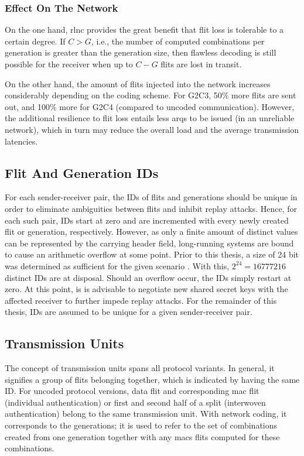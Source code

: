 \subsubsection{Effect On The Network}
On the one hand, \gls{rlnc} provides the great benefit that flit loss is tolerable to a certain degree. If $C > G$, i.e., the number of computed
combinations per generation is greater than the generation size, then flawless decoding is still possible for the receiver when up to $C - G$ flits
are lost in transit.

On the other hand, the amount of flits injected into the network increases considerably depending on the coding scheme. For G2C3, 50\% more flits are
sent out, and 100\% more for G2C4 (compared to uncoded communication). However, the additional resilience to flit loss entails less \glspl{arq} to be
issued (in an unreliable network), which in turn may reduce the overall load and the average transmission latencies.

\subsection{Flit And Generation IDs}\label{subsec:fidsandgids}
For each sender-receiver pair, the IDs of flits and generations should be unique in order to eliminate ambiguities between flits and inhibit replay
attacks. Hence, for each such pair, IDs start at zero and are incremented with every newly created flit or generation, respectively. However, as only a finite amount of
distinct values can be represented by the carrying header field, long-running systems are bound to cause an arithmetic overflow at some point. Prior
to this thesis, a size of 24 bit was determined as sufficient for the given scenario \cite[5]{franz18authdraft}. With this, $2^{24} = \num{16777216}$
distinct IDs are at disposal. Should an overflow occur, the IDs simply restart at zero. At this point, is is advisable to negotiate new shared
secret keys with the affected receiver to further impede replay attacks. For the remainder of this thesis, IDs are assumed to be unique for a given
sender-receiver pair.

\subsection{Transmission Units}
The concept of transmission units spans all protocol variants. In general, it signifies a group of flits belonging together, which is indicated by
having the same ID. For uncoded protocol versions, data flit and corresponding \gls{mac} flit (individual authentication) or first and second half of a
split (interwoven authentication) belong to the same transmission unit. With network coding, it corresponds to the generations; it is used to refer to
the set of combinations created from one generation together with any \glspl{mac} flits computed for these combinations.

